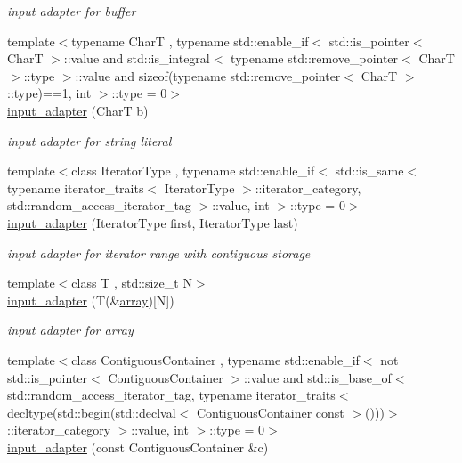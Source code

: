 \begin{DoxyCompactItemize}
\begin{DoxyCompactList}\small\item\em input adapter for buffer \end{DoxyCompactList}\item 
{\footnotesize template$<$typename CharT , typename std\+::enable\+\_\+if$<$ std\+::is\+\_\+pointer$<$ Char\+T $>$\+::value and std\+::is\+\_\+integral$<$ typename std\+::remove\+\_\+pointer$<$ Char\+T $>$\+::type $>$\+::value and sizeof(typename std\+::remove\+\_\+pointer$<$ Char\+T $>$\+::type)==1, int $>$\+::type  = 0$>$ }\\\mbox{\hyperlink{classnlohmann_1_1detail_1_1input__adapter_a86f035d9c4319360014b922b5e433ced}{input\+\_\+adapter}} (CharT b)
\begin{DoxyCompactList}\small\item\em input adapter for string literal \end{DoxyCompactList}\item 
{\footnotesize template$<$class Iterator\+Type , typename std\+::enable\+\_\+if$<$ std\+::is\+\_\+same$<$ typename iterator\+\_\+traits$<$ Iterator\+Type $>$\+::iterator\+\_\+category, std\+::random\+\_\+access\+\_\+iterator\+\_\+tag $>$\+::value, int $>$\+::type  = 0$>$ }\\\mbox{\hyperlink{classnlohmann_1_1detail_1_1input__adapter_ad6824b0f792691f75186c527fa31a6b4}{input\+\_\+adapter}} (Iterator\+Type first, Iterator\+Type last)
\begin{DoxyCompactList}\small\item\em input adapter for iterator range with contiguous storage \end{DoxyCompactList}\item 
{\footnotesize template$<$class T , std\+::size\+\_\+t N$>$ }\\\mbox{\hyperlink{classnlohmann_1_1detail_1_1input__adapter_aa2392138bf8307df1994dc7eb22d51ce}{input\+\_\+adapter}} (T(\&\mbox{\hyperlink{namespacenlohmann_1_1detail_a1ed8fc6239da25abcaf681d30ace4985af1f713c9e000f5d3f280adbd124df4f5}{array}})\mbox{[}N\mbox{]})
\begin{DoxyCompactList}\small\item\em input adapter for array \end{DoxyCompactList}\item 
{\footnotesize template$<$class Contiguous\+Container , typename std\+::enable\+\_\+if$<$ not std\+::is\+\_\+pointer$<$ Contiguous\+Container $>$\+::value and std\+::is\+\_\+base\+\_\+of$<$ std\+::random\+\_\+access\+\_\+iterator\+\_\+tag, typename iterator\+\_\+traits$<$ decltype(std\+::begin(std\+::declval$<$ Contiguous\+Container const $>$()))$>$\+::iterator\+\_\+category $>$\+::value, int $>$\+::type  = 0$>$ }\\\mbox{\hyperlink{classnlohmann_1_1detail_1_1input__adapter_a6f92fe82cb49a508dbfb297c5630cc7f}{input\+\_\+adapter}} (const Contiguous\+Container \&c)

\end{DoxyCompactItemize}
